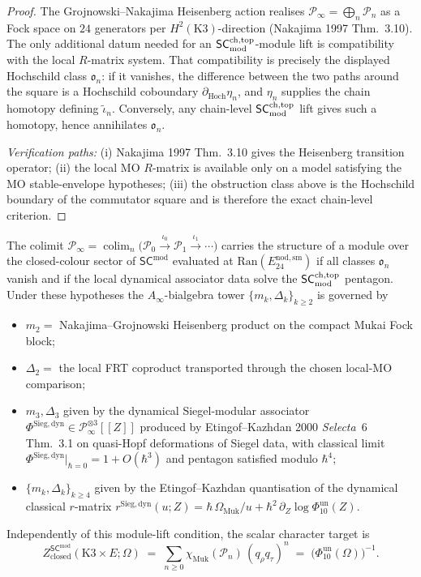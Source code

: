 \begin{proof}
The Grojnowski--Nakajima Heisenberg action realises
$\mathcal P_\infty = \bigoplus_n\mathcal P_n$ as a Fock space on $24$
generators per $H^2(\mathrm K3)$-direction (Nakajima 1997 Thm.~3.10).
The only additional datum needed for an $\mathsf{SC}^{\mathrm{ch,top}}_{\mathrm{mod}}$-module lift is
compatibility with the local $R$-matrix system. That compatibility is
precisely the displayed Hochschild class $\mathfrak{o}_n$: if it
vanishes, the difference between the two paths around the square is a
Hochschild coboundary $\partial_{\mathrm{Hoch}}\eta_n$, and
$\eta_n$ supplies the chain homotopy defining $\widetilde\iota_n$.
Conversely, any chain-level $\mathsf{SC}^{\mathrm{ch,top}}_{\mathrm{mod}}$ lift gives such a homotopy, hence
annihilates $\mathfrak{o}_n$.

\emph{Verification paths:}
(i) Nakajima 1997 Thm.~3.10 gives the Heisenberg transition operator;
(ii) the local MO $R$-matrix is available only on a model satisfying
the MO stable-envelope hypotheses;
(iii) the obstruction class above is the Hochschild boundary of the
commutator square and is therefore the exact chain-level criterion.
\end{proof}

\begin{theorem}
\label{thm:msco-Hilbert-colimit-SCmod}

The colimit
$\mathcal P_\infty = \operatorname{colim}_n
\bigl(\mathcal P_0\xrightarrow{\iota_0}\mathcal P_1\xrightarrow{\iota_1}\cdots\bigr)$
carries the structure of a module over the closed-colour sector of
$\mathsf{SC}^{\mathrm{mod}}$ evaluated at
$\mathrm{Ran}(E^{\mathrm{nod,sm}}_{24})$ if all classes
$\mathfrak{o}_n$ vanish and if the local dynamical associator data
solve the $\mathsf{SC}^{\mathrm{ch,top}}_{\mathrm{mod}}$ pentagon. Under these hypotheses the
$A_\infty$-bialgebra tower $\{m_k, \Delta_k\}_{k\geq 2}$ is governed by
\begin{itemize}
\item $m_2 =$ Nakajima--Grojnowski Heisenberg product on the compact
 Mukai Fock block;
\item $\Delta_2 =$ the local FRT coproduct transported through the
 chosen local-MO comparison;
\item $m_3, \Delta_3$ given by the dynamical Siegel-modular associator
 $\Phi^{\mathrm{Sieg,dyn}}\in\mathcal P_\infty^{\otimes 3}[[Z]]$
 produced by Etingof--Kazhdan 2000 \emph{Selecta}~6 Thm.~3.1 on
 quasi-Hopf deformations of Siegel data, with classical limit
 $\Phi^{\mathrm{Sieg,dyn}}|_{\hbar = 0} = 1 + O(\hbar^3)$
 and pentagon satisfied modulo $\hbar^4$;
\item $\{m_k, \Delta_k\}_{k\geq 4}$ given by the Etingof--Kazhdan
 quantisation of the dynamical classical $r$-matrix
 $r^{\mathrm{Sieg,dyn}}(u; Z) = \hbar\,\Omega_{\mathrm{Muk}}/u +
 \hbar^2\,\partial_Z\log\Phi_{10}^{\mathrm{un}}(Z)$.
\end{itemize}
Independently of this module-lift condition, the scalar character
target is
\[
 Z^{\mathsf{SC}^{\mathrm{mod}}}_{\mathrm{closed}}(\mathrm K3\times E;\Omega)
 \;=\;
 \sum_{n\geq 0}\chi_{\mathrm{Muk}}(\mathcal P_n)\,(q_\rho q_\tau)^n
 \;=\;
 \bigl(\Phi_{10}^{\mathrm{un}}(\Omega)\bigr)^{-1}.
\]
\end{theorem}


